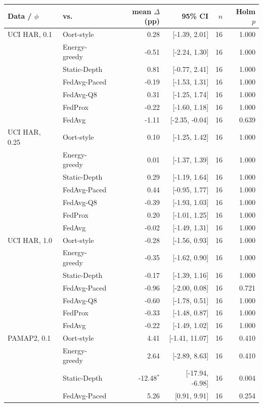 \begin{tabular}{@{}llrrrr@{}}
\toprule
Data / $\phi$ & vs. & mean $\Delta$ (pp) & 95\% CI & $n$ & Holm $p$\\
\midrule
UCI HAR, 0.1 & Oort-style & 0.28 & [-1.39, 2.01] & 16 & 1.000\\
 & Energy-greedy & -0.51 & [-2.24, 1.30] & 16 & 1.000\\
 & Static-Depth & 0.81 & [-0.77, 2.41] & 16 & 1.000\\
 & FedAvg-Paced & -0.19 & [-1.53, 1.31] & 16 & 1.000\\
 & FedAvg-Q8 & 0.31 & [-1.25, 1.74] & 16 & 1.000\\
 & FedProx & -0.22 & [-1.60, 1.18] & 16 & 1.000\\
 & FedAvg & -1.11 & [-2.35, -0.04] & 16 & 0.639\\
\midrule
UCI HAR, 0.25 & Oort-style & 0.10 & [-1.25, 1.42] & 16 & 1.000\\
 & Energy-greedy & 0.01 & [-1.37, 1.39] & 16 & 1.000\\
 & Static-Depth & 0.29 & [-1.19, 1.64] & 16 & 1.000\\
 & FedAvg-Paced & 0.44 & [-0.95, 1.77] & 16 & 1.000\\
 & FedAvg-Q8 & -0.39 & [-1.93, 1.03] & 16 & 1.000\\
 & FedProx & 0.20 & [-1.01, 1.25] & 16 & 1.000\\
 & FedAvg & -0.02 & [-1.49, 1.31] & 16 & 1.000\\
\midrule
UCI HAR, 1.0 & Oort-style & -0.28 & [-1.56, 0.93] & 16 & 1.000\\
 & Energy-greedy & -0.35 & [-1.62, 0.90] & 16 & 1.000\\
 & Static-Depth & -0.17 & [-1.39, 1.16] & 16 & 1.000\\
 & FedAvg-Paced & -0.96 & [-2.00, 0.08] & 16 & 0.721\\
 & FedAvg-Q8 & -0.60 & [-1.78, 0.51] & 16 & 1.000\\
 & FedProx & -0.33 & [-1.48, 0.87] & 16 & 1.000\\
 & FedAvg & -0.22 & [-1.49, 1.02] & 16 & 1.000\\
\midrule
PAMAP2, 0.1 & Oort-style & 4.41 & [-1.41, 11.07] & 16 & 0.410\\
 & Energy-greedy & 2.64 & [-2.89, 8.63] & 16 & 0.410\\
 & Static-Depth & -12.48$^{*}$ & [-17.94, -6.98] & 16 & 0.004\\
 & FedAvg-Paced & 5.26 & [0.91, 9.91] & 16 & 0.254\\

\end{tabular}
